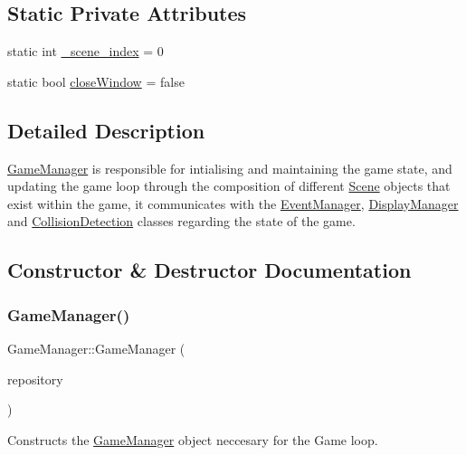 \subsection*{Static Private Attributes}
\begin{DoxyCompactItemize}
\item 
static int \hyperlink{class_game_manager_aedb575ca538853f3d7053b33bef238e0}{\+\_\+scene\+\_\+index} = 0
\item 
static bool \hyperlink{class_game_manager_a07c75a9507a0d82f88a0b62d808fcf3c}{close\+Window} = false
\end{DoxyCompactItemize}


\subsection{Detailed Description}
\hyperlink{class_game_manager}{Game\+Manager} is responsible for intialising and maintaining the game state, and updating the game loop through the composition of different \hyperlink{class_scene}{Scene} objects that exist within the game, it communicates with the \hyperlink{class_event_manager}{Event\+Manager}, \hyperlink{class_display_manager}{Display\+Manager} and \hyperlink{class_collision_detection}{Collision\+Detection} classes regarding the state of the game. 

\subsection{Constructor \& Destructor Documentation}
\mbox{\label{class_game_manager_a05f6a37de95fcea1313fe4476b95941d}} 
\subsubsection{\texorpdfstring{Game\+Manager()}{GameManager()}}
{\footnotesize\ttfamily Game\+Manager\+::\+Game\+Manager (\begin{DoxyParamCaption}\item[{std\+::shared\+\_\+ptr$<$ \hyperlink{class_repositiory_interface}{Repositiory\+Interface} $>$}]{repository }\end{DoxyParamCaption})}



Constructs the \hyperlink{class_game_manager}{Game\+Manager} object neccesary for the Game loop. 


